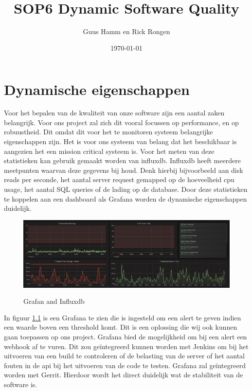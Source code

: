 \documentclass{scrreprt}
\title{SOP6 Dynamic Software Quality}
\author{Guus Hamm en Rick Rongen}
\date{\today}
\begin{document}
	\maketitle
	\tableofcontents
	\newpage
	\chapter{Dynamische eigenschappen}
	Voor het bepalen van de kwaliteit van onze software zijn een aantal zaken belangrijk. Voor ons project zal zich dit vooral focussen op performance, en op robuustheid. Dit omdat dit voor het te monitoren systeem belangrijke eigenschappen zijn. Het is voor ons systeem van belang dat het beschikbaar is aangezien het een mission critical systeem is. Voor het meten van deze statistieken kan gebruik gemaakt worden van influxdb. Influxdb heeft meerdere meetpunten waarvan deze gegevens bij houd. Denk hierbij bijvoorbeeld aan disk reads per seconde, het aantal server request gemapped op de hoeveelheid cpu usage, het aantal SQL queries of de lading op de database. Door deze statistieken te koppelen aan een dashboard als Grafana worden de dynamische eigenschappen duidelijk.
	\begin{figure}[ht]
		\centering
		\includegraphics[width=\linewidth]{grafna-influxdb.png}
		\label{fig:grafana&influxdb}
		\caption{Grafan and Influxdb}
	\end{figure}
	
	In figuur \ref{fig:grafana&influxdb} is een Grafana te zien die is ingesteld om een alert te geven indien een waarde boven een threshold komt. Dit is een oplossing die wij ook kunnen gaan toepassen op ons project. Grafana bied de mogelijkheid om bij een alert een webhook af te vuren. Dit zou geïntegreerd kunnen worden met Jenkins om bij het uitvoeren van een build te controleren of de belasting van de server of het aantal fouten in de api bij het uitvoeren van de code te testen. Grafana zal geïntegreerd worden met Gerrit. Hierdoor wordt het direct duidelijk wat de stabiliteit van de software is.
\end{document}
